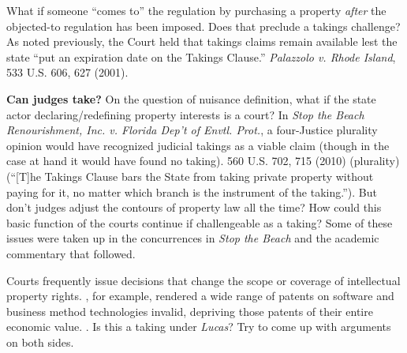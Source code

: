 \item What if someone ``comes to'' the regulation by purchasing a property
\textit{after} the objected-to regulation has been imposed. Does that preclude a
takings challenge? As noted previously, the Court held that takings claims
remain available lest the state ``put an expiration date on the Takings
Clause.'' \textit{Palazzolo v. Rhode Island}, 533 U.S. 606, 627 (2001).

\item \textbf{Can judges take?} On the question of nuisance definition, what if
the state actor declaring/redefining property interests is a court? In
\textit{Stop the Beach Renourishment, Inc. v. Florida Dep't of Envtl. Prot.}, a
four-Justice plurality opinion would have recognized judicial takings as a
viable claim (though in the case at hand it would have found no taking). 560
U.S. 702, 715 (2010) (plurality) (``[T]he Takings Clause bars the State from
taking private property without paying for it, no matter which branch is the
instrument of the taking.''). But don't judges adjust the contours of property
law all the time? How could this basic function of the courts continue if
challengeable as a taking? Some of these issues were taken up in the
concurrences in \textit{Stop the Beach} and the academic commentary that
followed.



Courts frequently issue decisions that change the scope or coverage of
intellectual property rights. , for example, rendered a wide range
of patents on software and business method technologies invalid, depriving those
patents of their entire economic value. . Is this a taking
under \emph{Lucas}? Try to come up with arguments on both sides.

